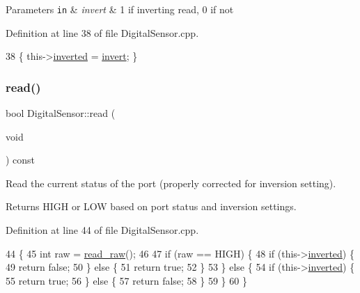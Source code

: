 \begin{DoxyParams}[1]{Parameters}
\mbox{\tt in}  & {\em invert} & 1 if inverting read, 0 if not \\
\hline
\end{DoxyParams}


Definition at line 38 of file Digital\+Sensor.\+cpp.


\begin{DoxyCode}
38 \{ this->\hyperlink{class_digital_sensor_a0458d9c3e2f781a776742a080d7b7e81}{inverted} = \hyperlink{class_digital_sensor_a1e6784022a127dd543bbfcc4f69c4802}{invert}; \}
\end{DoxyCode}
\mbox{\label{class_digital_sensor_a79dba881f434e5271d30c8e606994c9a}} 
\subsubsection{\texorpdfstring{read()}{read()}}
{\footnotesize\ttfamily bool Digital\+Sensor\+::read (\begin{DoxyParamCaption}\item[{void}]{ }\end{DoxyParamCaption}) const}



Read the current status of the port (properly corrected for inversion setting). 

\begin{DoxyReturn}{Returns}
H\+I\+GH or L\+OW based on port status and inversion settings. 
\end{DoxyReturn}


Definition at line 44 of file Digital\+Sensor.\+cpp.


\begin{DoxyCode}
44                                    \{
45     \textcolor{keywordtype}{int} raw = \hyperlink{class_digital_sensor_a22943d64a79b47263f677c5a6dd5d682}{read\_raw}();
46 
47     \textcolor{keywordflow}{if} (raw == HIGH) \{
48         \textcolor{keywordflow}{if} (this->\hyperlink{class_digital_sensor_a0458d9c3e2f781a776742a080d7b7e81}{inverted}) \{
49             \textcolor{keywordflow}{return} \textcolor{keyword}{false};
50         \} \textcolor{keywordflow}{else} \{
51             \textcolor{keywordflow}{return} \textcolor{keyword}{true};
52         \}
53     \} \textcolor{keywordflow}{else} \{
54         \textcolor{keywordflow}{if} (this->\hyperlink{class_digital_sensor_a0458d9c3e2f781a776742a080d7b7e81}{inverted}) \{
55             \textcolor{keywordflow}{return} \textcolor{keyword}{true};
56         \} \textcolor{keywordflow}{else} \{
57             \textcolor{keywordflow}{return} \textcolor{keyword}{false};
58         \}
59     \}
60 \}
\end{DoxyCode}
\mbox{\label{class_digital_sensor_a22943d64a79b47263f677c5a6dd5d682}} 
